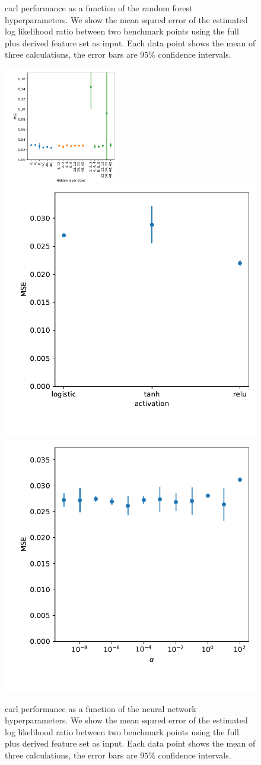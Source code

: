 \begin{figure}
  \caption{carl performance as a function of the random forest
    hyperparameters. We show the mean squred error of the estimated
    log likelihood ratio between two benchmark points using the full
    plus derived feature set as input. Each data point shows the mean
    of three calculations, the error bars are $95\%$ confidence
    intervals.}
  \label{fig:pointwise_tuning_derived_rf_tuning}
\end{figure}

\begin{figure}
  \includegraphics[width=0.45\textwidth]{figures/appendix/pointwise_tuning_full/mse_derived_mlp_hidden_layer_sizes.pdf}%
  \includegraphics[height=0.45\textwidth]{figures/appendix/pointwise_tuning_full/mse_derived_mlp_activation.pdf}\\%
  \includegraphics[height=0.45\textwidth]{figures/appendix/pointwise_tuning_full/mse_derived_mlp_alpha.pdf}%
  \caption{carl performance as a function of the neural network
    hyperparameters. We show the mean squred error of the estimated
    log likelihood ratio between two benchmark points using the full
    plus derived feature set as input. Each data point shows the mean
    of three calculations, the error bars are $95\%$ confidence
    intervals.}
  \label{fig:pointwise_tuning_derived_mlp_tuning}
\end{figure}

